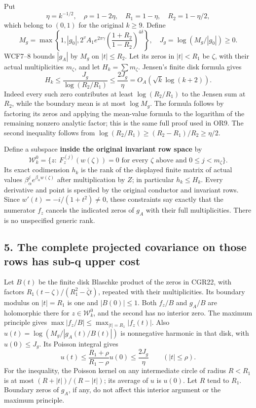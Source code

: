 \documentclass[11pt]{article}
\begin{document}
Put \[
\eta=k^{-1/2},\quad \rho=1-2\eta,\quad
R_1=1-\eta,\quad R_2=1-\eta/2,
\tag{CGR20}
\] which belong to \((0,1)\) for the original \(k\ge9\). Define \[
M_g=\max\left\{1,|g_0|,
2^vA_1e^{2\pi\gamma}
\left(\frac{1+R_2}{1-R_2}\right)^{4\delta}\right\},
\quad J_g=\log(M_g/|g_0|)\ge0.
\tag{CGR21}
\] WCF7--8 bounds \(|g_A|\) by \(M_g\) on \(|t|\le R_2\). Let its zeros in \(|t|<R_1\) be \(\zeta\), with their actual multiplicities \(m_\zeta\), and let \(H_k=\sum m_\zeta\). Jensen's finite disk formula gives \[
H_k\le\frac{J_g}{\log(R_2/R_1)}\le\frac{2J_g}{\eta}
=O_A(\sqrt{k}\log(k+2)).
\tag{CGR22}
\] Indeed every such zero contributes at least \(\log(R_2/R_1)\) to the Jensen sum at \(R_2\), while the boundary mean is at most \(\log M_g\). The formula follows by factoring its zeros and applying the mean-value formula to the logarithm of the remaining nonzero analytic factor; this is the same full proof used in OR9. The second inequality follows from \(\log(R_2/R_1)\ge(R_2-R_1)/R_2\ge\eta/2\).

Define a subspace \textbf{inside the original invariant row space} by \[
\mathcal W_k^0=
\{z:\ F_z^{(j)}(w(\zeta))=0
\text{ for every }\zeta\text{ above and }0\le j<m_\zeta\}.
\tag{CGR23}
\] Its exact codimension \(h_k\) is the rank of the displayed finite matrix of actual values \(\beta_\alpha^j e^{\beta_\alpha w(\zeta)}\) after multiplication by \(Z\); in particular \(h_k\le H_k\). Every derivative and point is specified by the original conductor and invariant rows. Since \(w'(t)=-i/(1+t^2)\ne0\), these constraints say exactly that the numerator \(f_z\) cancels the indicated zeros of \(g_A\) with their full multiplicities. There is no unspecified generic rank.

\subsection{5. The complete projected covariance on those rows has sub-q upper cost}\label{the-complete-projected-covariance-on-those-rows-has-sub-q-upper-cost}

Let \(B(t)\) be the finite disk Blaschke product of the zeros in CGR22, with factors \(R_1(t-\zeta)/(R_1^2-\bar\zeta t)\), repeated with their multiplicities. Its boundary modulus on \(|t|=R_1\) is one and \(|B(0)|\le1\). Both \(f_z/B\) and \(g_A/B\) are holomorphic there for \(z\in\mathcal W_k^0\), and the second has no interior zero. The maximum principle gives \(\max|f_z/B|\le\max_{|t|=R_1}|f_z(t)|\). Also \(u(t)=\log(M_g/|g_A(t)/B(t)|)\) is nonnegative harmonic in that disk, with \(u(0)\le J_g\). Its Poisson integral gives \[
u(t)\le\frac{R_1+\rho}{R_1-\rho}u(0)
\le\frac{2J_g}{\eta}\qquad(|t|\le\rho).
\tag{CGR24}
\] For the inequality, the Poisson kernel on any intermediate circle of radius \(R< R_1\) is at most \((R+|t|)/(R-|t|)\); its average of \(u\) is \(u(0)\). Let \(R\) tend to \(R_1\). Boundary zeros of \(g_A\), if any, do not affect this interior argument or the maximum principle.
\end{document}
